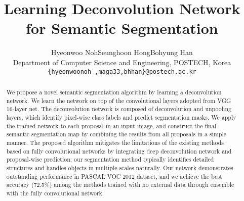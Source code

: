 \documentclass[10pt,twocolumn,letterpaper]{article}
\begin{document}
\title{Learning Deconvolution Network for Semantic Segmentation}

\author{Hyeonwoo Noh\hspace{1.7cm}Seunghoon Hong\hspace{1.7cm}Bohyung Han\\
Department of Computer Science and Engineering, POSTECH, Korea\\
{\tt\small \{hyeonwoonoh\_,maga33,bhhan\}@postech.ac.kr}}


\maketitle



\begin{abstract}
We propose a novel semantic segmentation algorithm by learning a deconvolution network.
We learn the network on top of the convolutional layers adopted from VGG 16-layer net. 
The deconvolution network is composed of deconvolution and unpooling layers, which identify pixel-wise class labels and predict segmentation masks.
We apply the trained network to each proposal in an input image, and construct the final semantic segmentation map by combining the results from all proposals in a simple manner.
The proposed algorithm mitigates the limitations of the existing methods based on fully convolutional networks by integrating deep deconvolution network and proposal-wise prediction; our segmentation method typically identifies detailed structures and handles objects in multiple scales naturally.
Our network demonstrates outstanding performance in PASCAL VOC 2012 dataset, and we achieve the best accuracy (72.5\%) among the methods trained with no external data through ensemble with the fully convolutional network.


\iffalse
Recent state-of-the-art semantic segmentation algorithms typically utilize convolutional neural network (CNN) designed for image classification task in a fully convolutional way.
Recent state-of-the-art semantic segmentation algorithms simply adapt convolutional neural network (CNN) in a traditional pixel labeling framework.
[[[modify this sentence in the future.. its ackward]]]

Since classification CNNs generate single class label for each receptive field, resulting segmentation tends to be coarse relative to its input image resolution. 
We propose supervised deconvolution network (SDN) which generate detailed pixel level segmentation from a single receptive field. SDN uses multiple layers of deconvolution and unpooling layers and is trained to predict both shape and class of object in input image. 
We apply this network to the semantic segmentation task by combining it with object proposal algorithm. 
By doing so, our algorithm predicts various class and shapes for objects in the scene precisely. 
We also demonstrate that through ensemble with other semantic segmentation network, our algorithm shows impressive performance enhencement.
We evaluate algorithm in the PASCAL VOC-2012 semantic segmentation task. 
\fi
\end{abstract}
\end{document}
